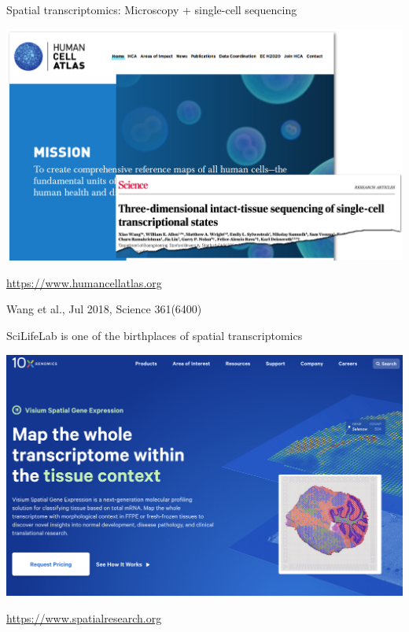 \documentclass[10pt]{beamer}
\newcommand{\credit}[1]{{\vspace{\fill} \par \raggedleft \scriptsize \mdseries \color{mDarkBrown} #1 \par}}
\begin{document}
\begin{frame}{Spatial transcriptomics: Microscopy + single-cell sequencing}
	\begin{center}
		\includegraphics[width=\textwidth]{./figures/hca.png} \\
	\end{center}
	\url{https://www.humancellatlas.org}
	\credit{Wang et al., Jul 2018, Science 361(6400)}
\end{frame}

\begin{frame}{SciLifeLab is one of the birthplaces of spatial transcriptomics}
	\begin{center}
		\includegraphics[width=\textwidth]{./figures/visium10x.png} \\
	\end{center}
	\url{https://www.spatialresearch.org}
\end{frame}
\end{document}
